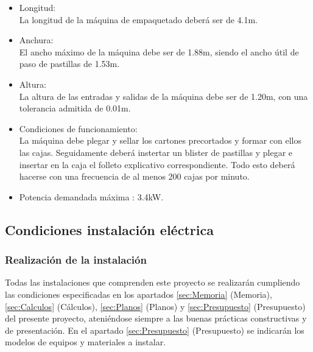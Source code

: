 		\begin{itemize}
			\item{Longitud:}\\
			La longitud de la máquina de empaquetado deberá ser de 4.1m. 

			\item{Anchura:}\\
			El ancho máximo de la máquina debe ser de 1.88m, siendo el ancho útil de paso de pastillas de 1.53m.
			
			\item{Altura:}\\
			La altura de las entradas y salidas de la máquina debe ser de 1.20m, con una tolerancia admitida de 0.01m.
			
			
			\item{Condiciones de funcionamiento: }\\
			La máquina debe plegar y sellar los cartones precortados y formar con ellos las cajas. Seguidamente deberá instertar un blister de pastillas y plegar e insertar en la caja el folleto explicativo correspondiente. Todo esto deberá hacerse con una frecuencia de al menos 200 cajas por minuto.
			

			\item{Potencia demandada máxima :} 3.4kW.
		
		\end{itemize}



\newpage

\subsection{Condiciones instalación eléctrica}

\subsubsection{Realización de la instalación}

Todas las instalaciones que comprenden este proyecto se realizarán cumpliendo las condiciones especificadas en los apartados \ref{sec:Memoria} (Memoria), \ref{sec:Calculos} (Cálculos), \ref{sec:Planos} (Planos) y \ref{sec:Presupuesto} (Presupuesto) del presente proyecto, ateniéndose siempre a las buenas prácticas constructivas y de presentación. En el apartado \ref{sec:Presupuesto} (Presupuesto) se indicarán los modelos de equipos y materiales a instalar. \\

